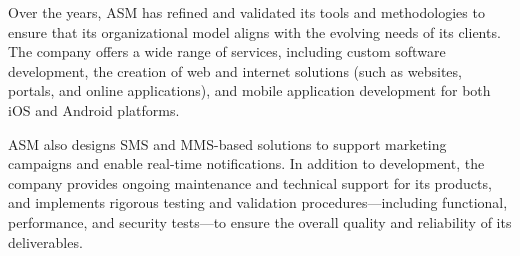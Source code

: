 Over the years, ASM has refined and validated its tools and methodologies to ensure that its organizational model aligns with the evolving needs of its clients. The company offers a wide range of services, including custom software development, the creation of web and internet solutions (such as websites, portals, and online applications), and mobile application development for both iOS and Android platforms.

ASM also designs SMS and MMS-based solutions to support marketing campaigns and enable real-time notifications. In addition to development, the company provides ongoing maintenance and technical support for its products, and implements rigorous testing and validation procedures—including functional, performance, and security tests—to ensure the overall quality and reliability of its deliverables.
